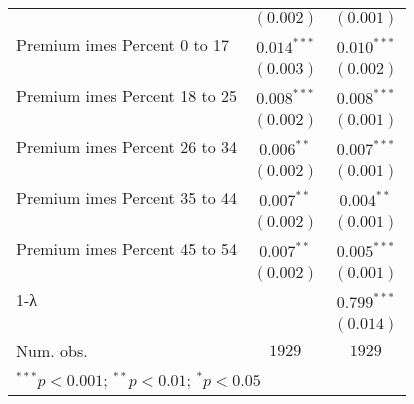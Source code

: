 \begin{table}
\begin{center}
\begin{tabular}{l c c}
                               & $(0.002)$       & $(0.001)$       \\
Premium 	imes Percent 0 to 17  & $0.014^{***}$   & $0.010^{***}$   \\
                               & $(0.003)$       & $(0.002)$       \\
Premium 	imes Percent 18 to 25 & $0.008^{***}$   & $0.008^{***}$   \\
                               & $(0.002)$       & $(0.001)$       \\
Premium 	imes Percent 26 to 34 & $0.006^{**}$    & $0.007^{***}$   \\
                               & $(0.002)$       & $(0.001)$       \\
Premium 	imes Percent 35 to 44 & $0.007^{**}$    & $0.004^{**}$    \\
                               & $(0.002)$       & $(0.001)$       \\
Premium 	imes Percent 45 to 54 & $0.007^{**}$    & $0.005^{***}$   \\
                               & $(0.002)$       & $(0.001)$       \\
1-λ                            &                 & $0.799^{***}$   \\
                               &                 & $(0.014)$       \\
\hline
Num. obs.                      & $1929$          & $1929$          \\
\hline
\multicolumn{3}{l}{\scriptsize{$^{***}p<0.001$; $^{**}p<0.01$; $^{*}p<0.05$}}
\end{tabular}
\label{table:coefficients}
\end{center}
\end{table}


